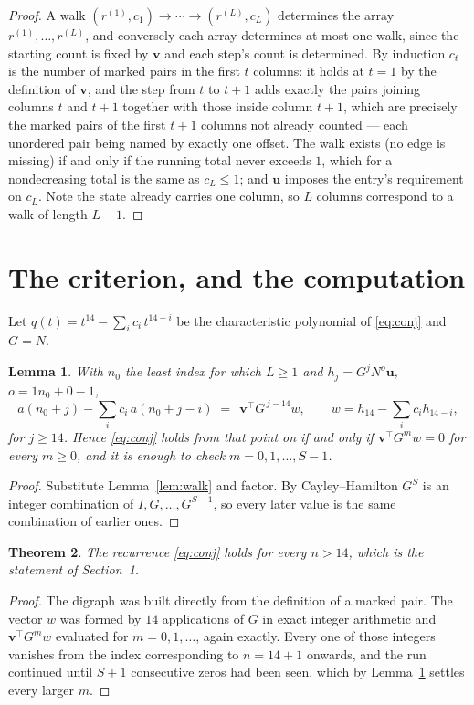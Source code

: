 \documentclass[11pt,a4paper]{article}
\theoremstyle{plain}
\newtheorem{theorem}{Theorem}
\newtheorem{lemma}[theorem]{Lemma}
\theoremstyle{definition}
\begin{document}
\begin{proof}
A walk $(r^{(1)},c_1)\to\cdots\to(r^{(L)},c_L)$ determines the array
$r^{(1)},\dots,r^{(L)}$, and conversely each array determines at most one walk, since the
starting count is fixed by $\mathbf{v}$ and each step's count is determined. By induction
$c_t$ is the number of marked pairs in the first $t$ columns: it holds at $t=1$ by the
definition of $\mathbf{v}$, and the step from $t$ to $t+1$ adds exactly the pairs joining
columns $t$ and $t+1$ together with those inside column $t+1$, which are precisely the marked
pairs of the first $t+1$ columns not already counted --- each unordered pair being named by
exactly one offset. The walk exists (no edge is missing) if and only if the running total
never exceeds $1$, which for a nondecreasing total is the same as $c_L\le1$; and
$\mathbf{u}$ imposes the entry's requirement on $c_L$. Note the state already carries one
column, so $L$ columns correspond to a walk of length $L-1$.
\end{proof}

\section{The criterion, and the computation}

Let $q(t)=t^{14}-\sum_i c_i\,t^{14-i}$ be the characteristic polynomial of
\eqref{eq:conj} and $G=N$.

\begin{lemma}\label{lem:crit}
With $n_0$ the least index for which $L\ge1$ and $h_j=G^{j}N^{o}\mathbf{u}$,
$o=1n_0+0-1$,
\[
a(n_0+j)-\sum_i c_i\,a(n_0+j-i)\;=\;\,\mathbf{v}^{\!\top}G^{\,j-14}w,
\qquad w=h_{14}-\sum_i c_i h_{14-i},
\]
for $j\ge14$. Hence \eqref{eq:conj} holds from that point on if and only if
$\mathbf{v}^{\!\top}G^{m}w=0$ for every $m\ge0$, and it is enough to check
$m=0,1,\dots,S-1$.
\end{lemma}

\begin{proof}
Substitute Lemma~\ref{lem:walk} and factor. By Cayley--Hamilton $G^{S}$ is an integer
combination of $I,G,\dots,G^{S-1}$, so every later value is the same combination of earlier
ones.
\end{proof}

\begin{theorem}
The recurrence \eqref{eq:conj} holds for every $n>14$, which is the statement of
Section~1.
\end{theorem}

\begin{proof}
The digraph was built directly from the definition of a marked pair. The vector $w$ was
formed by $14$ applications of $G$ in exact integer arithmetic and
$\mathbf{v}^{\!\top}G^{m}w$ evaluated for $m=0,1,\dots$, again exactly. Every one of
those integers vanishes from the index corresponding to $n=14+1$ onwards, and the run
continued until $S+1$ consecutive zeros had been seen, which by Lemma~\ref{lem:crit}
settles every larger $m$.
\end{proof}
\end{document}
